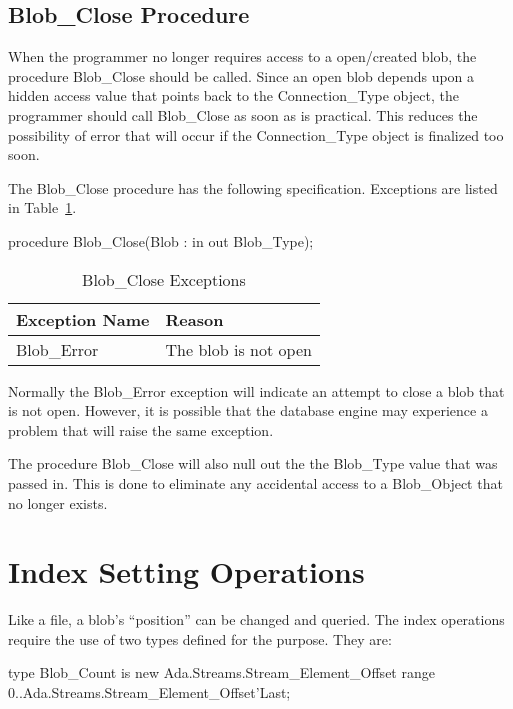 \documentclass[english,letterpaper]{book}
\begin{document}
\subsection{Blob\_Close Procedure}

When the programmer no longer requires access to a open/created blob,
the procedure Blob\_Close should be called. Since an open blob depends
upon a hidden access value that points back to the Connection\_Type
object, the programmer should call Blob\_Close as soon as is practical.
This reduces the possibility of error that will occur if the Connection\_Type
object is finalized too soon.

The Blob\_Close procedure has the following specification. Exceptions are
listed in Table~\ref{t:bclsx}.

\begin{Code}
procedure Blob_Close(Blob : in out Blob_Type);
\end{Code}

\begin{table}
   \begin{center}
      \begin{tabular}{ll}
         Exception Name    &  Reason\\
         \hline 
         Blob\_Error       &  The blob is not open\\
      \end{tabular}
   \end{center}
   \caption{Blob\_Close Exceptions}\label{t:bclsx}
\end{table}

Normally the Blob\_Error exception will indicate an attempt to close
a blob that is not open. However, it is possible that the database
engine may experience a problem that will raise the same exception.

The procedure Blob\_Close will also null out the the Blob\_Type value
that was passed in. This is done to eliminate any accidental access
to a Blob\_Object that no longer exists.


\section{Index Setting Operations}

Like a file, a blob's ``position'' can be changed and queried.
The index operations require the use of two types defined for the
purpose. They are:

\begin{Code}

   type Blob_Count is new 
      Ada.Streams.Stream_Element_Offset
      range 0..Ada.Streams.Stream_Element_Offset'Last;

\end{Code}
\end{document}

